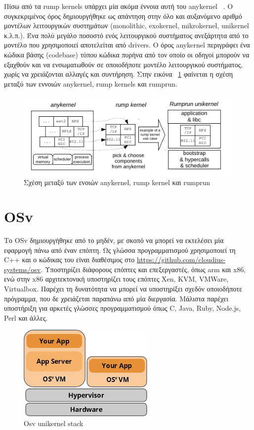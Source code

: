 Πίσω από τα rump kernels υπάρχει μία ακόμα έννοια αυτή του
anykernel ~\cite{kantee2012design}. O συγκεκριμένος όρος δημιουργήθηκε
ως απάντηση στην όλο και αυξανόμενο αριθμό μοντέλων λειτουργικών συστημάτων
(monolithic, exokernel, mikrokernel, unikernel κ.λ.π.). Ένα πολύ μεγάλο ποσοστό
ενός λειτουργικού συστήματος ανεξάρτητα από το μοντέλο που χρησιμοποιεί
αποτελείται από drivers. Ο όρος anykernel περιγράφει ένα κώδικα βάσης (codebase)
τύπου κώδικα πυρήνα από τον οποίο οι οδηγοί μπορούν να εξαχθούν και να
ενσωματωθούν σε οποιοδήποτε μοντέλο λειτουργικού συστήματος, χωρίς να
χρειάζονται αλλαγές και συντήρηση. Στην εικόνα ~\ref{fig3_3} φαίνεται η σχέση
μεταξύ των εννοιών anykernel, rump kernels και rumprun. 


\begin{figure}[htp]
\centering
\includegraphics[scale=0.8]{figures/from_anykernel_to_rump.png}
\caption{Σχέση μεταξύ των ενοιών anykernel, rump kernel και rumprun\label{fig3_3}}
\end{figure}

\section{OSv}
Το OSv δημιουργήθηκε από το μηδέν, με σκοπό να μπορεί να εκτελέσει μία εφαρμογή
πάνω από έναν επόπτη. Ως γλώσσα προγραμματισμού χρησιμοποιεί τη C++ και ο
κώδικας του είναι διαθέσιμος στο \url{https://github.com/cloudius-systems/osv}. 
Υποστηρίζει διάφορους επόπτες και επεξεργαστές, όπως arm και x86, ενώ στην
x86 αρχιτεκτονική υποστηρίζει τους επόπτες Xen, KVM, VMWare, Virtualbox. Παρέχει
τη δυνατότητα να μπορεί να υποστηρίξει σχεδόν οποιοδήποτε πρόγραμμα, που δε
χρειάζεται παραπάνω από μία διεργασία. Μάλιστα παρέχει υποστήριξη για αρκετές
γλώσσες προγραμματισμού όπως C, Java, Ruby, Node.js, Perl και άλλες. 

\begin{figure}[htp]
\centering
\includegraphics[scale=0.8]{figures/osv.jpg}
\caption{Osv unikernel stack\label{fig3_4}}
\end{figure}

